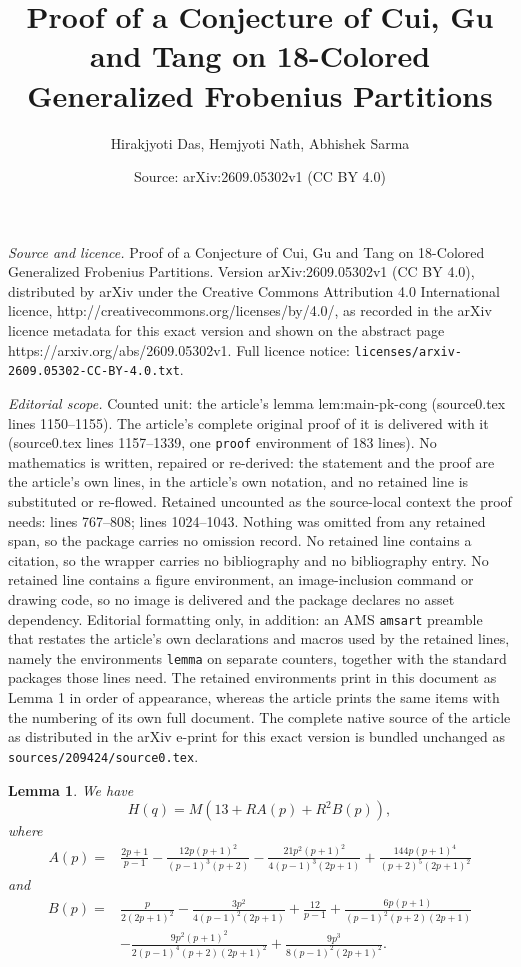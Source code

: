 \documentclass[10pt,a4paper]{amsart}
\title{Proof of a Conjecture of Cui, Gu and Tang on 18-Colored Generalized Frobenius Partitions}
\author{Hirakjyoti Das, Hemjyoti Nath, Abhishek Sarma}
\date{Source: arXiv:2609.05302v1 (CC BY 4.0)}
\newtheorem{lemma}{Lemma}
\begin{document}
\maketitle

\noindent\emph{Source and licence.} Proof of a Conjecture of Cui, Gu and Tang on 18-Colored Generalized Frobenius Partitions. Version arXiv:2609.05302v1 (CC BY 4.0), distributed by arXiv under the Creative Commons Attribution 4.0 International licence, http://creativecommons.org/licenses/by/4.0/, as recorded in the arXiv licence metadata for this exact version and shown on the abstract page https://arxiv.org/abs/2609.05302v1. Full licence notice: \texttt{licenses/arxiv-2609.05302-CC-BY-4.0.txt}.\par\smallskip

\noindent\textit{Editorial scope.} Counted unit: the article's lemma lem:main-pk-cong (source0.tex lines 1150--1155). The article's complete original proof of it is delivered with it (source0.tex lines 1157--1339, one \texttt{proof} environment of 183 lines). No mathematics is written, repaired or re-derived: the statement and the proof are the article's own lines, in the article's own notation, and no retained line is substituted or re-flowed.  Retained uncounted as the source-local context the proof needs: lines 767--808; lines 1024--1043.  Nothing was omitted from any retained span, so the package carries no omission record.  No retained line contains a citation, so the wrapper carries no bibliography and no bibliography entry.  No retained line contains a figure environment, an image-inclusion command or drawing code, so no image is delivered and the package declares no asset dependency.  Editorial formatting only, in addition: an AMS \texttt{amsart} preamble that restates the article's own declarations and macros used by the retained lines, namely the environments \texttt{lemma} on separate counters, together with the standard packages those lines need.  The retained environments print in this document as Lemma 1 in order of appearance, whereas the article prints the same items with the numbering of its own full document.  The complete native source of the article as distributed in the arXiv e-print for this exact version is bundled unchanged as \texttt{sources/209424/source0.tex}.
\begin{lemma}\label{lem:H-decomp}
We have
\begin{equation*}
H(q)=M\left(13+RA(p)+R^2B(p)\right),
\end{equation*}
where
\begin{align*}
A(p)
={}&
\frac{2p+1}{p-1}
-
\frac{12p(p+1)^2}
     {(p-1)^3(p+2)}
-
\frac{21p^2(p+1)^2}
     {4(p-1)^3(2p+1)}
+
\frac{144p(p+1)^4}
     {(p+2)^5(2p+1)^2}
\end{align*}
and
\begin{align*}
B(p)
={}&
\frac{p}{2(2p+1)^2}
-
\frac{3p^2}
     {4(p-1)^2(2p+1)}
+
\frac{12}{p-1}
+
\frac{6p(p+1)}
     {(p-1)^2(p+2)(2p+1)}
\\
&-
\frac{9p^2(p+1)^2}
     {2(p-1)^4(p+2)(2p+1)^2}
+
\frac{9p^3}
     {8(p-1)^2(2p+1)^2}.
\end{align*}
\end{lemma}
\end{document}
